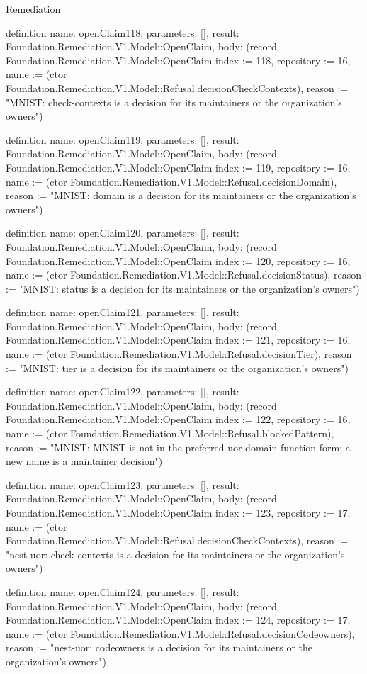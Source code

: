 \begin{lexlean}{Remediation}
\begin{semanticmodule}
definition{
  name: openClaim118,
  parameters: [],
  result: Foundation.Remediation.V1.Model::OpenClaim,
  body: (record Foundation.Remediation.V1.Model::OpenClaim {index := 118, repository := 16, name := (ctor Foundation.Remediation.V1.Model::Refusal.decisionCheckContexts), reason := "MNIST: check-contexts is a decision for its maintainers or the organization's owners"})
}

definition{
  name: openClaim119,
  parameters: [],
  result: Foundation.Remediation.V1.Model::OpenClaim,
  body: (record Foundation.Remediation.V1.Model::OpenClaim {index := 119, repository := 16, name := (ctor Foundation.Remediation.V1.Model::Refusal.decisionDomain), reason := "MNIST: domain is a decision for its maintainers or the organization's owners"})
}

definition{
  name: openClaim120,
  parameters: [],
  result: Foundation.Remediation.V1.Model::OpenClaim,
  body: (record Foundation.Remediation.V1.Model::OpenClaim {index := 120, repository := 16, name := (ctor Foundation.Remediation.V1.Model::Refusal.decisionStatus), reason := "MNIST: status is a decision for its maintainers or the organization's owners"})
}

definition{
  name: openClaim121,
  parameters: [],
  result: Foundation.Remediation.V1.Model::OpenClaim,
  body: (record Foundation.Remediation.V1.Model::OpenClaim {index := 121, repository := 16, name := (ctor Foundation.Remediation.V1.Model::Refusal.decisionTier), reason := "MNIST: tier is a decision for its maintainers or the organization's owners"})
}

definition{
  name: openClaim122,
  parameters: [],
  result: Foundation.Remediation.V1.Model::OpenClaim,
  body: (record Foundation.Remediation.V1.Model::OpenClaim {index := 122, repository := 16, name := (ctor Foundation.Remediation.V1.Model::Refusal.blockedPattern), reason := "MNIST: MNIST is not in the preferred uor-{domain}-{function} form; a new name is a maintainer decision"})
}

definition{
  name: openClaim123,
  parameters: [],
  result: Foundation.Remediation.V1.Model::OpenClaim,
  body: (record Foundation.Remediation.V1.Model::OpenClaim {index := 123, repository := 17, name := (ctor Foundation.Remediation.V1.Model::Refusal.decisionCheckContexts), reason := "nest-uor: check-contexts is a decision for its maintainers or the organization's owners"})
}

definition{
  name: openClaim124,
  parameters: [],
  result: Foundation.Remediation.V1.Model::OpenClaim,
  body: (record Foundation.Remediation.V1.Model::OpenClaim {index := 124, repository := 17, name := (ctor Foundation.Remediation.V1.Model::Refusal.decisionCodeowners), reason := "nest-uor: codeowners is a decision for its maintainers or the organization's owners"})
}


\end{semanticmodule}
\end{lexlean}

